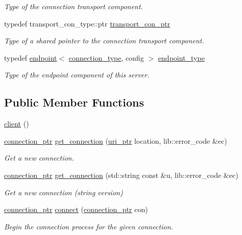 \begin{DoxyCompactItemize}
\begin{DoxyCompactList}\small\item\em Type of the connection transport component. \end{DoxyCompactList}\item 
typedef transport\+\_\+con\+\_\+type\+::ptr \hyperlink{classwebsocketpp_1_1client_a6087b4e73f1864c893e16b33017b2da6}{transport\+\_\+con\+\_\+ptr}
\begin{DoxyCompactList}\small\item\em Type of a shared pointer to the connection transport component. \end{DoxyCompactList}\item 
typedef \hyperlink{classwebsocketpp_1_1endpoint}{endpoint}$<$ \hyperlink{classwebsocketpp_1_1client_a29c9f0410ed33a331faac19f8efea874}{connection\+\_\+type}, config $>$ \hyperlink{classwebsocketpp_1_1client_a37e4950ce23369e6614c28612b7ef0b4}{endpoint\+\_\+type}
\begin{DoxyCompactList}\small\item\em Type of the endpoint component of this server. \end{DoxyCompactList}\end{DoxyCompactItemize}
\subsection*{Public Member Functions}
\begin{DoxyCompactItemize}
\item 
\hyperlink{classwebsocketpp_1_1client_a700cf840e10fe9f10cdbe3a2b9e65d7c}{client} ()
\item 
\hyperlink{classwebsocketpp_1_1client_a2e187bbb2beac676bbfbc2e8065de83e}{connection\+\_\+ptr} \hyperlink{classwebsocketpp_1_1client_aa95cec974921e32bc37a61c683ae240d}{get\+\_\+connection} (\hyperlink{namespacewebsocketpp_aae370ea5ac83a8ece7712cb39fc23f5b}{uri\+\_\+ptr} location, lib\+::error\+\_\+code \&ec)
\begin{DoxyCompactList}\small\item\em Get a new connection. \end{DoxyCompactList}\item 
\hyperlink{classwebsocketpp_1_1client_a2e187bbb2beac676bbfbc2e8065de83e}{connection\+\_\+ptr} \hyperlink{classwebsocketpp_1_1client_a1197f043c8c6c03398e4f07be4bdf135}{get\+\_\+connection} (std\+::string const \&u, lib\+::error\+\_\+code \&ec)
\begin{DoxyCompactList}\small\item\em Get a new connection (string version) \end{DoxyCompactList}\item 
\hyperlink{classwebsocketpp_1_1client_a2e187bbb2beac676bbfbc2e8065de83e}{connection\+\_\+ptr} \hyperlink{classwebsocketpp_1_1client_a818c30343180123bf1fee6dc21524bae}{connect} (\hyperlink{classwebsocketpp_1_1client_a2e187bbb2beac676bbfbc2e8065de83e}{connection\+\_\+ptr} con)
\begin{DoxyCompactList}\small\item\em Begin the connection process for the given connection. \end{DoxyCompactList}\end{DoxyCompactItemize}
